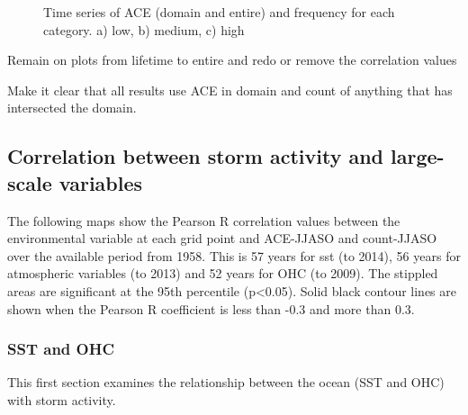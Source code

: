 \begin{figure}
	\caption{Time series of ACE (domain and entire) and frequency for each category. a) low, b) medium, c) high }\label{fig:counts}
\end{figure}

Remain on plots from lifetime to entire and redo or remove the correlation values

Make it clear that all results use ACE in domain and count of anything that has intersected the domain.

\subsection{Correlation between storm activity and large-scale variables}


The following maps show the Pearson R correlation values between the environmental variable at each grid point and ACE-JJASO and count-JJASO over the available period from 1958. This is 57 years for sst (to 2014), 56 years for atmospheric variables (to 2013) and 52 years for OHC (to 2009). The stippled areas are significant at the 95th percentile (p\textless0.05). Solid black contour lines are shown when the Pearson R coefficient is less than -0.3 and more than 0.3.


\subsubsection{SST and OHC}

This first section examines the relationship between the ocean (SST and OHC) with storm activity.
	
